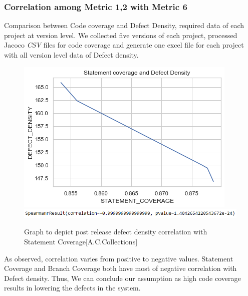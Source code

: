 \documentclass[letterpaper, 12 pt, conference]{ieeetran}  %
\begin{document}
\subsubsection{Correlation among Metric 1,2 with Metric 6 }
Comparison between Code coverage and Defect Density, required data of each project at version level. We collected five versions of each project, processed Jacoco \textit{CSV} files for code coverage and generate one excel file for each project with all version level data of Defect density.
\begin{figure}[H]
    \centering
     \includegraphics[scale=0.60]{metric1 vs 6 commons-collections.png}%
     \\ \includegraphics[scale=0.55]{metric1 vs 6 commons-collections_spearmanr.png} %
    \caption{Graph to depict post release defect density correlation with Statement Coverage{\footnotesize[A.C.Collections]}}
 \end{figure}
As observed, correlation varies from positive to negative values. Statement Coverage and Branch Coverage both have most of negative correlation with Defect density. Thus, We can conclude our assumption as high code coverage results in lowering the defects in the system. 
\end{document}
